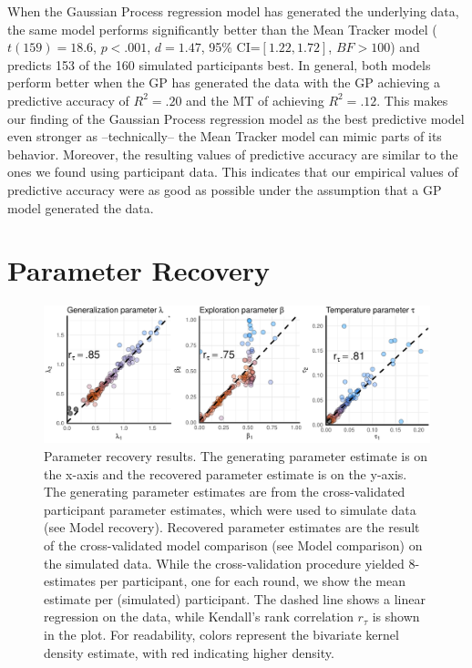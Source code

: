When the Gaussian Process regression model has generated the underlying data, the same model performs significantly better than the Mean Tracker model ($t(159)=18.6$, $p<.001$, $d=1.47$, 95\% CI=$[1.22, 1.72]$, $BF>100$) and predicts 153 of the 160 simulated participants best. In general, both models perform better when the GP has generated the data with the GP achieving a predictive accuracy of $R^2=.20$ and the MT of achieving $R^2=.12$. This makes our finding of the Gaussian Process regression model as the best predictive model even stronger as --technically-- the Mean Tracker model can mimic parts of its behavior. Moreover, the resulting values of predictive accuracy are similar to the ones we found using participant data. This indicates that our empirical values of predictive accuracy were as good as possible under the assumption that a GP model generated the data.



\section*{Parameter Recovery} 
\begin{figure}[ht!]
\centering
\includegraphics[width=0.8\linewidth]{recovery.pdf}
\caption{Parameter recovery results. The generating parameter estimate is on the x-axis and the recovered parameter estimate is on the y-axis. The generating parameter estimates are from the cross-validated participant parameter estimates, which were used to simulate data (see Model recovery). Recovered parameter estimates are the result of the cross-validated model comparison (see Model comparison) on the simulated data. While the cross-validation procedure yielded $8$-estimates per participant, one for each round, we show the mean estimate per (simulated) participant. The dashed line shows a linear regression on the data, while Kendall's rank correlation $r_\tau$ is shown in the plot. For readability, colors represent the bivariate kernel density estimate, with red indicating higher density.} 
\label{fig:paramRecover}
\vspace{-1mm}
\end{figure}

